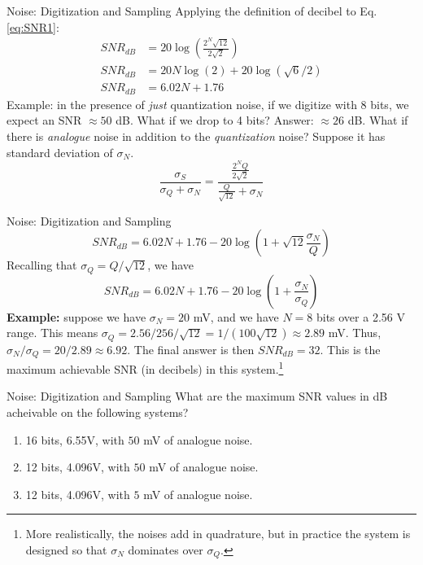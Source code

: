 \documentclass{beamer}
\begin{document}
\begin{frame}{Noise: Digitization and Sampling}
\small
Applying the definition of decibel to Eq. \ref{eq:SNR1}:
\begin{align}
SNR_{dB} &= 20\log\left(\frac{2^N \sqrt{12}}{2\sqrt{2}} \right) \\
SNR_{dB} &= 20 N \log(2) + 20\log(\sqrt{6}/2) \\
SNR_{dB} &= 6.02 N + 1.76
\end{align}
Example: in the presence of \textit{just} quantization noise, if we digitize with 8 bits, we expect an SNR $\approx 50$ dB.  What if we drop to 4 bits? Answer: $\approx 26$ dB.  What if there is \textit{analogue} noise in addition to the \textit{quantization} noise?  Suppose it has standard deviation of $\sigma_N$.
\begin{equation}
\frac{\sigma_S}{\sigma_Q+\sigma_N} = \frac{\frac{2^N Q}{2\sqrt{2}}}{\frac{Q}{\sqrt{12}} + \sigma_N}
\end{equation}
\end{frame}

\begin{frame}{Noise: Digitization and Sampling}
\small
\begin{equation}
SNR_{dB} = 6.02 N + 1.76 - 20\log\left( 1 + \sqrt{12} \frac{\sigma_N}{Q}\right)
\end{equation}
Recalling that $\sigma_Q = Q/\sqrt{12}$, we have
\begin{equation}
SNR_{dB} = 6.02 N + 1.76 - 20\log\left( 1 + \frac{\sigma_N}{\sigma_Q}\right)
\end{equation}
\textbf{Example:} suppose we have $\sigma_N = 20$ mV, and we have $N=8$ bits over a 2.56 V range.  This means $\sigma_Q = 2.56/256/\sqrt{12} = 1/(100\sqrt{12}) \approx 2.89$ mV.  Thus, $\sigma_N/\sigma_Q = 20/2.89 \approx 6.92$.  The final answer is then $SNR_{dB} = 32$.  This is the maximum achievable SNR (in decibels) in this system.\footnote{More realistically, the noises add in quadrature, but in practice the system is designed so that $\sigma_N$ dominates over $\sigma_Q$.}
\end{frame}

\begin{frame}{Noise: Digitization and Sampling}
\small
What are the maximum SNR values in dB acheivable on the following systems?
\begin{enumerate}
\item 16 bits, 6.55V, with $50$ mV of analogue noise.
\item 12 bits, 4.096V, with $50$ mV of analogue noise.
\item 12 bits, 4.096V, with $5$ mV of analogue noise.
\end{enumerate}
\end{frame}
\end{document}

